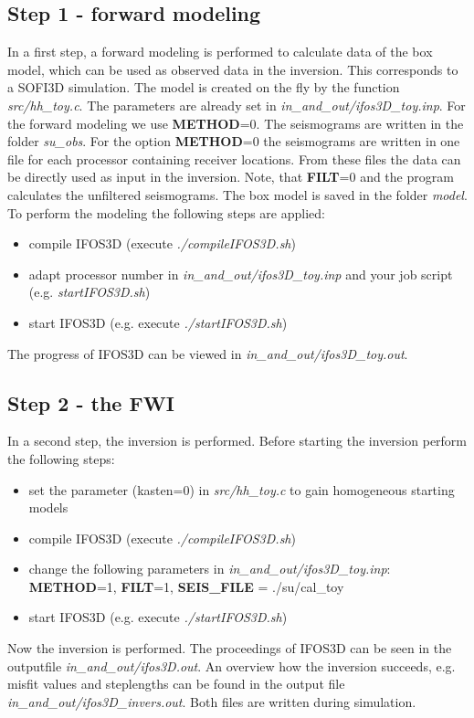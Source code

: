 \subsection{Step 1 - forward modeling}
In a first step, a forward modeling is performed to calculate data of the box model, which can be used as observed data in the inversion. This corresponds to a SOFI3D simulation. The model is created on the fly by the function \textit{src/hh\_toy.c}. The parameters are already set in \textit{in\_and\_out/ifos3D\_toy.inp}. For the forward modeling we use \textbf{METHOD}=0. The seismograms are written in the folder \textit{su\_obs}. For the option \textbf{METHOD}=0 the seismograms are written in one file for each processor containing receiver locations. From these files the data can be directly used as input in the inversion. Note, that \textbf{FILT}=0 and the program calculates the unfiltered seismograms. The box model is saved in the folder \textit{model}.\\
To perform the modeling the following steps are applied:
\begin{itemize}
 \item compile IFOS3D (execute \textit{./compileIFOS3D.sh})
 \item adapt processor number in \textit{in\_and\_out/ifos3D\_toy.inp} and your job script (e.g. \textit{startIFOS3D.sh})
 \item start IFOS3D (e.g. execute \textit{./startIFOS3D.sh})
\end{itemize}
The progress of IFOS3D can be viewed in \textit{in\_and\_out/ifos3D\_toy.out}. 
\subsection{Step 2 - the FWI}
In a second step, the inversion is performed. Before starting the inversion perform the following steps:
\begin{itemize}
 \item set the parameter (kasten=0) in \textit{src/hh\_toy.c} to gain homogeneous starting models
 \item compile IFOS3D (execute \textit{./compileIFOS3D.sh})
 \item change the following parameters in \textit{in\_and\_out/ifos3D\_toy.inp}: \textbf{METHOD}=1, \textbf{FILT}=1, \textbf{SEIS\_FILE} = ./su/cal\_toy
 \item start IFOS3D (e.g. execute \textit{./startIFOS3D.sh})
\end{itemize}
Now the inversion is performed. The proceedings of IFOS3D can be seen in the outputfile \textit{in\_and\_out/ifos3D.out}. An overview how the inversion succeeds, e.g. misfit values and steplengths can be found in the output file \textit{in\_and\_out/ifos3D\_invers.out}. Both files are written during simulation.

